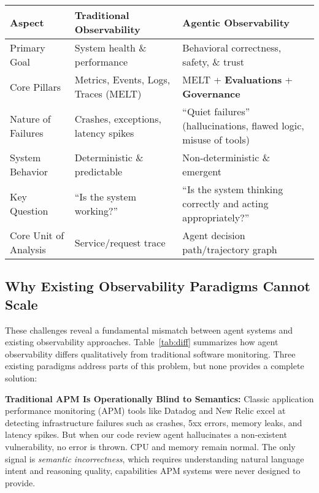 \documentclass[sigplan,screen,9pt]{acmart}
\begin{document}
\begin{table*}[t]
  \caption{Traditional vs. Agentic Observability: A Comparative Framework}
  \label{tab:diff}
  \centering
  \begin{tabular}{@{}p{3cm}p{5.5cm}p{5.5cm}@{}}
    \toprule
    \textbf{Aspect} &
    \textbf{Traditional Observability} &
    \textbf{Agentic Observability} \\
    \midrule
    Primary Goal &
    System health \& performance &
    Behavioral correctness, safety, \& trust \\
    Core Pillars &
    Metrics, Events, Logs, Traces (MELT)~\cite{li2022observability} &
    MELT + \textbf{Evaluations} + \textbf{Governance} \\
    Nature of Failures &
    Crashes, exceptions, latency spikes &
    ``Quiet failures'' (hallucinations, flawed logic, misuse of tools) \\
    System Behavior &
    Deterministic \& predictable &
    Non-deterministic \& emergent \\
    Key Question &
    ``Is the system working?'' &
    ``Is the system thinking correctly and acting appropriately?'' \\
    Core Unit of Analysis &
    Service/request trace &
    Agent decision path/trajectory graph \\
    \bottomrule
  \end{tabular}
\end{table*}

\subsection{Why Existing Observability Paradigms Cannot Scale}

These challenges reveal a fundamental mismatch between agent systems and existing observability approaches. Table~\ref{tab:diff} summarizes how agent observability differs qualitatively from traditional software monitoring. Three existing paradigms address parts of this problem, but none provides a complete solution:

\textbf{Traditional APM Is Operationally Blind to Semantics:} Classic application performance monitoring (APM) tools like Datadog and New Relic excel at detecting infrastructure failures such as crashes, 5xx errors, memory leaks, and latency spikes. But when our code review agent hallucinates a non-existent vulnerability, no error is thrown. CPU and memory remain normal. The only signal is \emph{semantic incorrectness}, which requires understanding natural language intent and reasoning quality, capabilities APM systems were never designed to provide.
\end{document}
